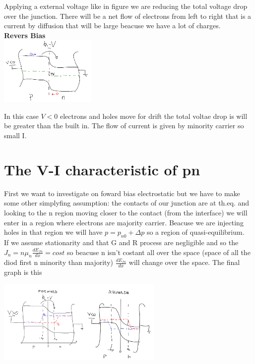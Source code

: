 Applying a external voltage like in figure we are reducing the total voltage drop over the junction. There will be a net flow of electrons from left to right that is a current by diffusion that will be large beacuse we have a lot of charges.\\
{\bf Revers Bias}\\

\centering
\includegraphics[width=0.35\textwidth]{pn8.png}\\
\raggedright

In this case $V<0$ electrons and holes move for drift the total voltae drop is will be greater than the built in. The flow of current is given by minority carrier so small I.\\

\section{The V-I characteristic of pn }
First we want to investigate on foward bias electrostatic but we have to make some other simplyfing assumption: the contacts of our junction are at th.eq. and looking to the n region moving closer to the contact (from the interface) we will enter in a region where electrons are majority carrier. Beacuse we are injecting holes in that region we will have $p=p_{n0}+\Delta p$ so a region of quasi-equilibrium.\\
If we assume stationarity and that G and R process are negligible and so the $J_n=n\mu_n \frac{dE_{fn}}{dx}=cost$ so beacuse n isn't costant all over the space (space of all the diod first n minority than majority) $\frac{dE_{fn}}{dx}$ will change over the space.
The final graph is this 

\centering
\includegraphics[width=0.6\textwidth]{pn9.png}\\
\raggedright

